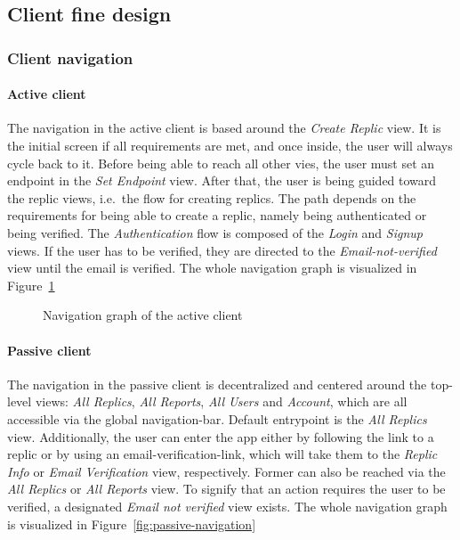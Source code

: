 \subsection{Client fine design}\label{subsec:client-fine-design-common}

\subsubsection{Client navigation}

\paragraph{Active client}
The navigation in the active client is based around the \textit{Create Replic} view.
It is the initial screen if all requirements are met, and once inside, the user will always cycle back to it. \newline
Before being able to reach all other vies, the user must set an endpoint in the \textit{Set Endpoint} view.
After that, the user is being guided toward the replic views, i.e.\ the flow for creating replics.
The path depends on the requirements for being able to create a replic, namely being authenticated or being verified.
The \textit{Authentication} flow is composed of the \textit{Login} and \textit{Signup} views.
If the user has to be verified, they are directed to the \textit{Email-not-verified} view until the email is verified.
The whole navigation graph is visualized in Figure~\ref{fig:active-navigation}

\begin{figure}
    \centering

    \caption{Navigation graph of the active client}
    \label{fig:active-navigation}
\end{figure}

\paragraph{Passive client}
The navigation in the passive client is decentralized and centered around the top-level views: \textit{All Replics}, \textit{All Reports}, \textit{All Users} and \textit{Account}, which are all accessible via the global navigation-bar.
Default entrypoint is the \textit{All Replics} view.
Additionally, the user can enter the app either by following the link to a replic or by using an email-verification-link, which will take them to the \textit{Replic Info} or \textit{Email Verification} view, respectively.
Former can also be reached via the \textit{All Replics} or \textit{All Reports} view.
To signify that an action requires the user to be verified, a designated \textit{Email not verified} view exists.
The whole navigation graph is visualized in Figure~\ref{fig:passive-navigation}

